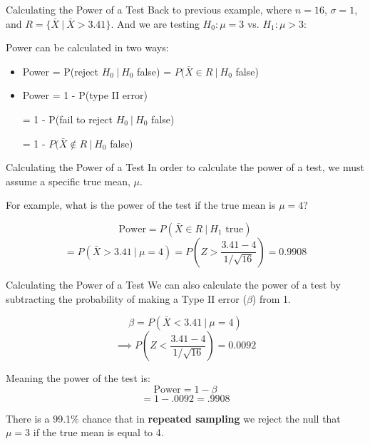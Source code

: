 \documentclass{beamer}
\begin{document}
\begin{frame}{Calculating the Power of a Test}
	Back to previous example, where $n=16$, $\sigma=1$, and $R=\{ \bar{X}  \ \vert \  \bar{X} > 3.41 \}$. And we are testing $H_0: \mu=3$ vs. $H_1: \mu>3$:
	
	Power can be calculated in two ways: 
	
	\begin{itemize}
		\item Power = P(reject $H_0 \ \vert \ H_0$ false) = $P(\bar{X}  \in R \ \vert \ H_0$ false)
		
		
		\item Power = 1 - P(type II error) 
		
		\hspace{10mm} = 1 - P(fail to reject $H_0 \ \vert \  H_0$ false) 

		\hspace{10mm} = 1 - $P(\bar{X} \notin R \ \vert \ H_0$ false)
	\end{itemize}
	
	
\end{frame}



\begin{frame}{Calculating the Power of a Test}
	In order to calculate the power of a test, we must assume a specific true mean, $\mu$.

	For example, what is the power of the test if the true mean is $\mu = 4$?
	
	\pause\[
		\text{Power} = P(\bar{X} \in R \ \vert \ H_1 \text{ true})
	\]
	\[
		= P(\bar{X} > 3.41 \ \vert \ \mu=4) = P(Z > \frac{3.41-4}{1/\sqrt{16}})= 0.9908
	\]
\end{frame}



\begin{frame}{Calculating the Power of a Test}
	We can also calculate the power of a test by subtracting the probability of making a Type II error ($\beta$) from 1. 

	\[
		\beta = P(\bar{X} < 3.41 \ \vert \  \mu = 4) 
	\] 
	\pause 
	\[ 
		\implies P(Z < \frac{3.41-4}{1/\sqrt{16}}) = 0.0092
	\]

	Meaning the power of the test is:
	\[ 
		\text{Power} = 1 - \beta
	\]
	\[
		= 1-.0092 = .9908
	\]
	
	There is a 99.1\% chance that in \textbf{repeated sampling} we reject the null that $\mu = 3$ if the true mean is equal to 4.
\end{frame}
\end{document}
